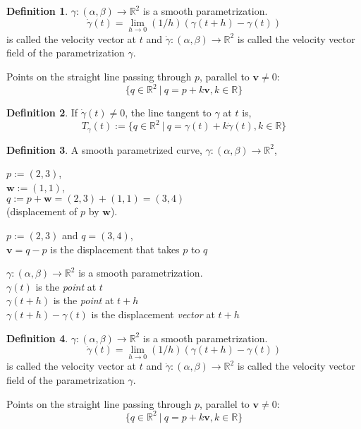 \documentclass[twocolumn,20pt,fleqn]{extarticle}
\newcommand{\sep}{\vspace{0.5cm}}
\theoremstyle{plain}
\theoremstyle{definition}
\newtheorem*{definition}{Definition}
\theoremstyle{remark}
\begin{document}
\begin{definition}
$\gamma : (\alpha,\beta) \to \mathbb{R}^2$ is a smooth parametrization.
\[\dot{\gamma}(t) = \lim_{h\to 0} (1/h)(\gamma(t+h) - \gamma(t))\]
is called the velocity vector at $t$ and $\dot{\gamma} : (\alpha, \beta) \to \mathbb{R}^2$ is called the velocity vector field of the parametrization $\gamma$.
\end{definition}
\newpage
Points on the straight line passing through $p$, parallel to $\mathbf{v}\neq 0$:
\[\{q \in \mathbb{R}^2 \ |\ q = p  + k\mathbf{v} , k \in \mathbb{R}\}\]

\begin{definition}
  If $\dot{\gamma}(t)\neq 0$, the line tangent to $\gamma$ at $t$ is,
  \[T_\gamma(t):=\{q \in \mathbb{R}^2 \ |\ q = \gamma(t) + k\dot{\gamma}(t) , k\in \mathbb{R}\}\]
\end{definition}

\begin{definition}
  A smooth parametrized curve, $\gamma : (\alpha,\beta) \to \mathbb{R}^2$,\end{definition}


\clearpage



$p := (2,3)$,\\ $\mathbf{w} := (1,1)$,\\ $q:=p + \mathbf{w} = (2,3) + (1,1) = (3,4)$ \\ (displacement of $p$ by $\mathbf{w}$).

\sep
$p := (2,3)$ and $q=(3,4)$,\\
$\mathbf{v}= q - p$ is the displacement that takes $p$ to $q$ 
\sep

$\gamma : (\alpha,\beta) \to \mathbb{R}^2$ is a smooth parametrization.\\
$\gamma(t)$ is the \emph{point} at $t$\\
$\gamma(t+h)$ is the \emph{point} at $t+h$\\
$\gamma(t+h)-\gamma(t)$ is the displacement \emph{vector} at $t+h$\\



\begin{definition}
$\gamma : (\alpha,\beta) \to \mathbb{R}^2$ is a smooth parametrization.
\[\dot{\gamma}(t) = \lim_{h\to 0} (1/h)(\gamma(t+h) - \gamma(t))\]
is called the velocity vector at $t$ and $\dot{\gamma} : (\alpha, \beta) \to \mathbb{R}^2$ is called the velocity vector field of the parametrization $\gamma$.
\end{definition}
\newpage
Points on the straight line passing through $p$, parallel to $\mathbf{v}\neq 0$:
\[\{q \in \mathbb{R}^2 \ |\ q = p  + k\mathbf{v} , k \in \mathbb{R}\}\]
\end{document}
